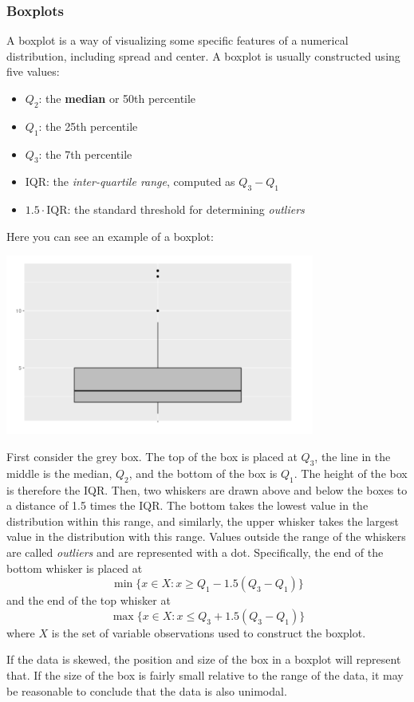 \documentclass[10pt]{article}
\newcommand{\spacer}[0]{\par\vspace{0.1in}}
\begin{document}
\subsubsection{Boxplots}
A boxplot is a way of visualizing some specific features of a numerical distribution, including spread and center. A boxplot is usually constructed using five values:
\begin{itemize}
    \item $Q_2$: the \textbf{median} or 50th percentile
    \item $Q_1$: the 25th percentile
    \item $Q_3$: the 7th percentile
    \item IQR: the \textit{inter-quartile range}, computed as $Q_3-Q_1$
    \item $1.5\cdot \text{IQR}$: the standard threshold for determining \textit{outliers}
\end{itemize}
Here you can see an example of a boxplot:
\begin{center}
    \includegraphics[width=4in]{images/bp1.png}
\end{center}
First consider the grey box. The top of the box is placed at $Q_3$, the line in the middle is the median, $Q_2$, and the bottom of the box is $Q_1$. The height of the box is therefore the IQR. Then, two whiskers are drawn above and below the boxes to a distance of 1.5 times the IQR. The bottom takes the lowest value in the distribution within this range, and similarly, the upper whisker takes the largest value in the distribution with this range. Values outside the range of the whiskers are called \textit{outliers} and are represented with a dot. Specifically, the end of the bottom whisker is placed at
$$
    \min \{x\in X:x\geq Q_1-1.5(Q_3-Q_1)\}
$$
and the end of the top whisker at
$$
    \max \{x\in X:x\leq Q_3+1.5(Q_3-Q_1)\}
$$
where $X$ is the set of variable observations used to construct the boxplot.
\spacer
If the data is skewed, the position and size of the box in a boxplot will represent that. If the size of the box is fairly small relative to the range of the data, it may be reasonable to conclude that the data is also unimodal.
\end{document}

